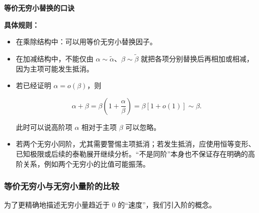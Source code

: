 \documentclass[fontset=fandol]{ctexart}
\newenvironment{custom}[1]{\par\noindent\textbf{#1}\quad}{\par\vspace{0.8em}}
\begin{document}
\begin{custom}{等价无穷小替换的口诀}

\begin{center}


\end{center}



\textbf{具体规则：}

\begin{itemize}

\item 在乘除结构中：可以用等价无穷小替换因子。

\item 在加减结构中，不能仅由 $\alpha\sim\widetilde\alpha$、$\beta\sim\widetilde\beta$ 就把各项分别替换后再相加或相减，因为主项可能发生抵消。

\item 若已经证明 $\alpha=o(\beta)$，则

\[

\alpha+\beta

=\beta\left(1+\frac{\alpha}{\beta}\right)

=\beta[1+o(1)]

\sim\beta.

\]

此时可以说高阶项 $\alpha$ 相对于主项 $\beta$ 可以忽略。

\item 若两个无穷小同阶，尤其需要警惕主项抵消；若发生抵消，应使用恒等变形、已知极限或后续的泰勒展开继续分析。“不是同阶”本身也不保证存在明确的高阶关系，例如两个无穷小的比值可能振荡。

\end{itemize}

\end{custom}



\subsubsection{等价无穷小与无穷小量阶的比较}



为了更精确地描述无穷小量趋近于 0 的“速度”，我们引入阶的概念。
\end{document}
